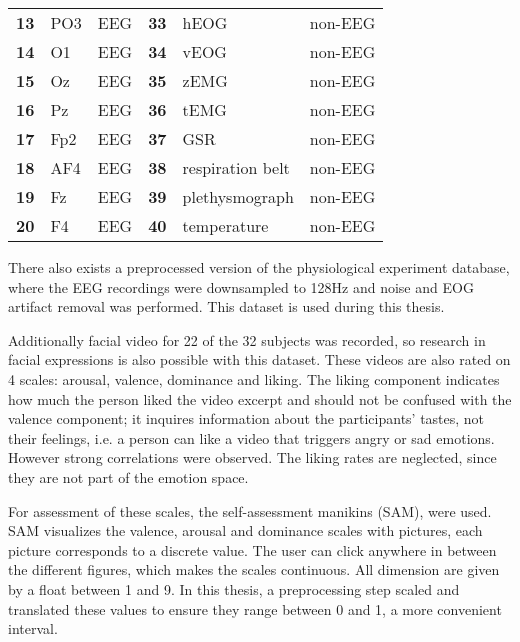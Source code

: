 \begin{table}[]
\begin{tabular}{l|ll|l|ll}
\textbf{13}      & PO3           & EEG               & \textbf{33}      & hEOG             & non-EEG           \\
\textbf{14}      & O1            & EEG               & \textbf{34}      & vEOG             & non-EEG           \\
\textbf{15}      & Oz            & EEG               & \textbf{35}      & zEMG             & non-EEG           \\
\textbf{16}      & Pz            & EEG               & \textbf{36}      & tEMG             & non-EEG           \\
\textbf{17}      & Fp2           & EEG               & \textbf{37}      & GSR              & non-EEG           \\
\textbf{18}      & AF4           & EEG               & \textbf{38}      & respiration belt & non-EEG           \\
\textbf{19}      & Fz            & EEG               & \textbf{39}      & plethysmograph   & non-EEG           \\
\textbf{20}      & F4            & EEG               & \textbf{40}      & temperature      & non-EEG          
\end{tabular}
\end{table}

\npar

There also exists a preprocessed version of the physiological experiment database, where the EEG recordings were downsampled to 128Hz and noise and EOG artifact removal was performed. This dataset is used during this thesis.

\npar

Additionally facial video for 22 of the 32 subjects was recorded, so research in facial expressions is also possible with this dataset. These videos are also rated on 4 scales: arousal, valence, dominance and liking. The liking component indicates how much the person liked the video excerpt and should not be confused with the valence component; it inquires information about the participants' tastes, not their feelings, i.e. a person can like a video that triggers angry or sad emotions. However strong correlations were observed\citep{DEAP}. The liking rates are neglected, since they are not part of the emotion space.

\npar

For assessment of these scales, the self-assessment manikins (SAM), were used\cite{DEAP}. SAM visualizes the valence, arousal and dominance scales with pictures, each picture corresponds to a discrete value. The user can click anywhere in between the different figures, which makes the scales continuous. All dimension are given by a float between 1 and 9. In this thesis, a preprocessing step scaled and translated these values to ensure they range between 0 and 1, a more convenient interval.

